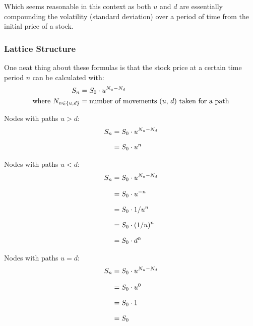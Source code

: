\documentclass[12pt, letterpaper]{article}\usepackage{float}
\begin{document}
\noindent Which seems reasonable in this context as both ${u}$ and ${d}$ are essentially compounding the volatility (standard deviation) over a period of time from the initial price of a stock.

\bigskip

\subsubsection*{Lattice Structure}

One neat thing about these formulas is that the stock price at a certain time period ${n}$ can be calculated with:
\begin{align*}
  \centering
  S_n &= S_0 \cdot u^{N_u-N_d} \\
  \text{where}~N_{n \in \{u,d\}} &= \text{number of movements (${u}$, ${d}$) taken for a path}
\end{align*}

\bigskip

Nodes with paths ${u > d}$:
\begin{equation*}
  \setlength{\jot}{10pt}
  \begin{split}
    {S}_n
    & = {S}_0 \cdot {u}^{N_u-N_d} \\
    & = {S}_0 \cdot {u}^n
  \end{split}
\end{equation*}

\pagebreak

Nodes with paths ${u < d}$:
\begin{equation*}
  \setlength{\jot}{10pt}
  \begin{split}
    {S}_n
    & = {S}_0 \cdot {u}^{N_u-N_d} \\
    & = {S}_0 \cdot {u^{-n}} \\
    & = {S}_0 \cdot {1/u^n} \\
    & = {S}_0 \cdot ({1/u})^n \\
    & = {S}_0 \cdot {d^n}
  \end{split}
\end{equation*}

\bigskip

Nodes with paths ${u = d}$:
\begin{equation*}
  \setlength{\jot}{10pt}
  \begin{split}
    {S}_n
    & = {S}_0 \cdot {u}^{N_u-N_d} \\
    & = {S}_0 \cdot {u^0} \\
    & = {S}_0 \cdot 1 \\
    & = {S}_0
  \end{split}
\end{equation*}
\end{document}
